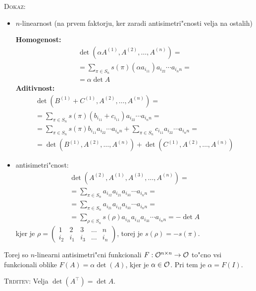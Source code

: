 \textsc{Dokaz:}
\begin{itemize}
	\item $n$-linearnost (na prvem faktorju, ker zaradi antisimetri"cnosti velja na ostalih)
	
	\textbf{Homogenost:}
	\begin{multline*}
		\det(\alpha A^{(1)}, A^{(2)}, \ldots, A^{(n)}) = \\
		= \sum_{\pi \in S_n} s(\pi) (\alpha a_{i_11}) a_{i_22} \cdots a_{i_nn} = \\
		= \alpha \det A
	\end{multline*}
	\textbf{Aditivnost:}
	\begin{multline*}
		\det (B^{(1)} + C^{(1)}, A^{(2)}, \ldots, A^{(n)}) = \\
		= \sum_{\pi \in S_n} s(\pi) (b_{i_11} + c_{i_11}) a_{i_22} \cdots a_{i_nn} = \\
		= \sum_{\pi \in S_n} s(\pi) b_{i_11} a_{i_22} \cdots a_{i_nn} + \sum_{\pi \in S_n} c_{i_11} a_{i_22} \cdots a_{i_nn} = \\
		= \det(B^{(1)}, A^{(2)}, \ldots, A^{(n)}) + \det (C^{(1)}, A^{(2)}, \ldots, A^{(n)})
	\end{multline*}
	
	\item antisimetri"cnost:
	\begin{multline*}
		\det(A^{(2)}, A^{(1)}, A^{(3)}, \ldots, A^{(n)}) = \\
		= \sum_{\pi \in S_n} a_{i_12} a_{i_21} a_{i_33} \cdots a_{i_nn} = \\
		= \sum_{\pi \in S_n} a_{i_21} a_{i_12} a_{i_33} \cdots a_{i_nn} = \\
		= \sum_{\rho \in S_n} s(\rho) a_{i_21} a_{i_12} a_{i_33} \cdots a_{i_nn} = -\det A
	\end{multline*}
	kjer je $\rho = \begin{pmatrix}
	1 & 2 & 3 & \ldots & n \\
	i_2 & i_1 & i_3 & \ldots & i_n
	\end{pmatrix}$, torej je $s(\rho) = - s(\pi)$.
\end{itemize}
Torej so $n$-linearni antisimetri"cni funkcionali $F: \mathcal{O}^{n \times n} \to \mathcal{O}$ to"cno vsi funkcionali oblike $F(A) = \alpha \det(A)$, kjer je $\alpha \in \mathcal{O}$. Pri tem je $\alpha = F(I)$.

\textsc{Trditev:} Velja $\det (A^\intercal)  = \det A$. 

